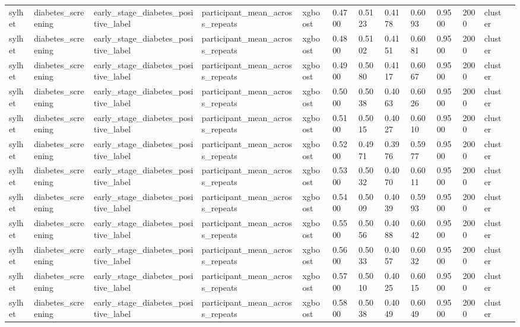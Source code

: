 \begin{tabular}{lllllllllllll}
sylhet & diabetes\_screening & early\_stage\_diabetes\_positive\_label & participant\_mean\_across\_repeats & xgboost & 0.4700 & 0.5123 & 0.4178 & 0.6093 & 0.9500 & 2000 & cluster &  \\
sylhet & diabetes\_screening & early\_stage\_diabetes\_positive\_label & participant\_mean\_across\_repeats & xgboost & 0.4800 & 0.5102 & 0.4151 & 0.6081 & 0.9500 & 2000 & cluster &  \\
sylhet & diabetes\_screening & early\_stage\_diabetes\_positive\_label & participant\_mean\_across\_repeats & xgboost & 0.4900 & 0.5080 & 0.4117 & 0.6067 & 0.9500 & 2000 & cluster &  \\
sylhet & diabetes\_screening & early\_stage\_diabetes\_positive\_label & participant\_mean\_across\_repeats & xgboost & 0.5000 & 0.5038 & 0.4063 & 0.6026 & 0.9500 & 2000 & cluster &  \\
sylhet & diabetes\_screening & early\_stage\_diabetes\_positive\_label & participant\_mean\_across\_repeats & xgboost & 0.5100 & 0.5015 & 0.4027 & 0.6010 & 0.9500 & 2000 & cluster &  \\
sylhet & diabetes\_screening & early\_stage\_diabetes\_positive\_label & participant\_mean\_across\_repeats & xgboost & 0.5200 & 0.4971 & 0.3976 & 0.5977 & 0.9500 & 2000 & cluster &  \\
sylhet & diabetes\_screening & early\_stage\_diabetes\_positive\_label & participant\_mean\_across\_repeats & xgboost & 0.5300 & 0.5032 & 0.4070 & 0.6011 & 0.9500 & 2000 & cluster &  \\
sylhet & diabetes\_screening & early\_stage\_diabetes\_positive\_label & participant\_mean\_across\_repeats & xgboost & 0.5400 & 0.5009 & 0.4039 & 0.5993 & 0.9500 & 2000 & cluster &  \\
sylhet & diabetes\_screening & early\_stage\_diabetes\_positive\_label & participant\_mean\_across\_repeats & xgboost & 0.5500 & 0.5056 & 0.4088 & 0.6042 & 0.9500 & 2000 & cluster &  \\
sylhet & diabetes\_screening & early\_stage\_diabetes\_positive\_label & participant\_mean\_across\_repeats & xgboost & 0.5600 & 0.5033 & 0.4057 & 0.6032 & 0.9500 & 2000 & cluster &  \\
sylhet & diabetes\_screening & early\_stage\_diabetes\_positive\_label & participant\_mean\_across\_repeats & xgboost & 0.5700 & 0.5010 & 0.4025 & 0.6015 & 0.9500 & 2000 & cluster &  \\
sylhet & diabetes\_screening & early\_stage\_diabetes\_positive\_label & participant\_mean\_across\_repeats & xgboost & 0.5800 & 0.5038 & 0.4049 & 0.6049 & 0.9500 & 2000 & cluster &  \\

\end{tabular}
